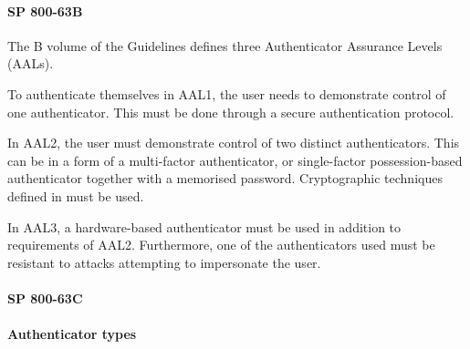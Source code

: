 
\paragraph{SP 800-63B}
The B volume of the Guidelines defines three Authenticator Assurance Levels (AALs).

To authenticate themselves in AAL1, the user needs to demonstrate control of one authenticator. This must be done through a secure authentication protocol.

In AAL2, the user must demonstrate control of two distinct authenticators. This can be in a form of a multi-factor authenticator, or single-factor possession-based authenticator together with a memorised password. Cryptographic techniques defined in
must be used.

In AAL3, a hardware-based authenticator must be used in addition to requirements of AAL2. Furthermore, one of the authenticators used must be resistant to attacks attempting to impersonate the user.

\paragraph{SP 800-63C}


\paragraph{Authenticator types}
